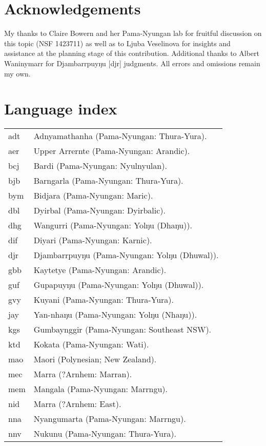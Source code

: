\documentclass[output=paper]{langsci/langscibook}
\begin{document}
\section*{Acknowledgements} 

My thanks to Claire Bowern and her Pama-Nyungan lab for fruitful discussion on this topic (NSF 1423711) as well as to Ljuba Veselinova for insights and assistance at the planning stage of this contribution. Additional thanks to Albert Waninymarr for Djambarrpuyŋu [djr] judgments. All errors and omissions remain my own.

\section*{Language index}
\setlength\LTleft{0pt}
\setlength\LTright{0pt}
\begin{longtable}{@{} l l @{\extracolsep{\stretch{1}}}}
adt&Adnyamathanha (Pama-Nyungan: Thura-Yura).\\
aer&Upper Arrernte (Pama-Nyungan: Arandic).\\
bcj&Bardi (Pama-Nyungan: Nyulnyulan).\\
bjb&Barngarla (Pama-Nyungan: Thura-Yura).\\
bym&Bidjara (Pama-Nyungan: Maric).\\
dbl&Dyirbal (Pama-Nyungan: Dyirbalic).\\
dhg&Wangurri (Pama-Nyungan: Yolŋu (Dhaŋu)).\\
dif&Diyari (Pama-Nyungan: Karnic).\\
djr&Djambarrpuyŋu (Pama-Nyungan: Yolŋu (Dhuwal)).\\
gbb&Kaytetye (Pama-Nyungan: Arandic).\\
guf&Gupapuyŋu (Pama-Nyungan: Yolŋu (Dhuwal)).\\
gvy&Kuyani (Pama-Nyungan: Thura-Yura).\\
jay&Yan-nhaŋu (Pama-Nyungan: Yolŋu (Nhaŋu)).\\
kgs&Gumbaynggir (Pama-Nyungan: Southeast NSW).\\
ktd&Kokata (Pama-Nyungan: Wati).\\
mao&Maori (Polynesian; New Zealand).\\
mec&Marra (?Arnhem: Marran).\\
mem&Mangala (Pama-Nyungan: Marrngu).\\
nid&Marra (?Arnhem: East).\\
nna&Nyangumarta (Pama-Nyungan: Marrngu).\\
nnv&Nukunu (Pama-Nyungan: Thura-Yura).\\

\end{longtable}
\end{document}

